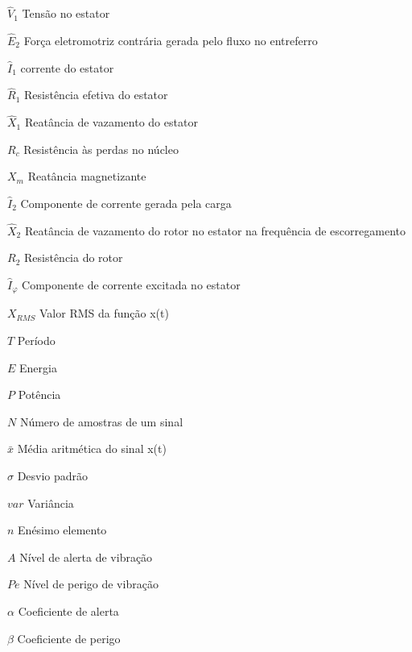 \begin{simbolos}
  \item[$\hat{V}_1$] Tensão no estator
  \item[$\hat{E}_2$] Força eletromotriz contrária gerada pelo fluxo no entreferro
  \item[$\hat{I}_1$] corrente do estator
  \item[$\hat{R}_1$] Resistência efetiva do estator
  \item[$\hat{X}_1$] Reatância de vazamento do estator
  \item[$R_c$] Resistência às perdas no núcleo
  \item[$X_m$] Reatância magnetizante
  \item[$\hat{I}_2$] Componente de corrente gerada pela carga
  \item[$\hat{X}_2$] Reatância de vazamento do rotor no estator na frequência de escorregamento
  \item[$R_2$] Resistência do rotor
  \item[$\hat{I}_\varphi$] Componente de corrente excitada no estator
  \item[$X_{RMS}$] Valor RMS da função x(t)
  \item[$T$] Período
  \item[$E$] Energia 
  \item[$P$] Potência
  \item[$N$] Número de amostras de um sinal
  \item[$\bar{x}$] Média aritmética do sinal x(t)
  \item[$\sigma$] Desvio padrão
  \item[$var$] Variância
  \item[$n$] Enésimo elemento
  \item[$A$] Nível de alerta de vibração
  \item[$Pe$] Nível de perigo de vibração  
  \item[$\alpha$] Coeficiente de alerta
  \item[$\beta$] Coeficiente de perigo      
\end{simbolos}